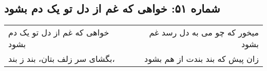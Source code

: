 \begin{center}
\section*{شماره ۵۱: خواهی که غم از دل تو یک دم بشود}
\label{sec:051}
\begin{longtable}{l p{0.5cm} r}
خواهی که غم از دل تو یک دم بشود
&&
میخور که چو می به دل رسد غم بشود
\\
بگشای سر زلف بتان، بند ز بند،
&&
زان پیش که بند بندت از هم بشود
\\
\end{longtable}
\end{center}
